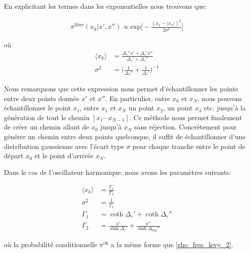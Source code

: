 \documentclass[11pt]{article}
\theoremstyle{definition}
\theoremstyle{remark}
\begin{document}
En explicitant les termes dans les exponentielles nous trouvons que: 

\begin{align} 
\label{rho_free_levy_2}
\pi^{\mathrm{libre}}(x_k|x',x'') \propto \mathrm{exp}\Big[ - \frac{(x_k - \langle x_k \rangle)^2}{2 \sigma^2} \Big]
\end{align}

où 
\begin{align} 
\langle x_k \rangle &= \frac{\Delta_{\tau}'' x' + \Delta_{\tau}'x''}{\Delta_{\tau}' + \Delta_{\tau}''} \\
\sigma^2 &= \Big(\frac{1}{\Delta_{\tau}''} + \frac{1}{\Delta_{\tau}'}\Big)^{-1}
\end{align}

Nous remarquons que cette expression nous permet d'échantillonner les points entre deux points donnée $x'$ et $x''$. En particulier, entre $x_0$ et $x_N$, nous pouvons échantillonner le point $x_1$, entre $x_1$ et $x_N$ un point $x_2$, un point $x_3$ etc. jusqu'à la génération de tout le chemin $[x_1 \cdots x_{N-1}]$. Ce méthode nous permet finalement de créer un chemin allant de $x_0$ jusqu'à $x_N$ sans réjection. Concrètement pour générer un chemin entre deux points quelconque, il suffit de échantillonner d'une distribution gaussienne avec l'écart type $\sigma$ pour chaque tranche entre le point de départ $x_0$ et le point d'arrivée $x_N$. 

Dans le cas de l'oscillateur harmonique, nous avons les paramètres suivants: 

\begin{align}
\label{levy_parameters_ho}
\langle x_k \rangle &= \frac{\Gamma_1}{\Gamma_2} \\
\sigma^2 &= \frac{1}{\Gamma_1} \\
\Gamma_1 &= \coth{\Delta_{\tau}'} + \coth{\Delta_{\tau}''} \\
\Gamma_2 &= \frac{x'}{\sinh{\Delta_{\tau}'}} + \frac{x''}{\sinh{\Delta_{tau}''}}
\end{align}

où la probabilité conditionnelle $\pi^{\mathrm{oh}}$ a la même forme que \eqref{rho_free_levy_2}. 
\end{document}
